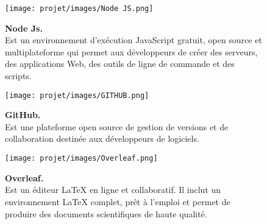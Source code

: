 \vspace{0.5cm}

\begin{figure}[H]
    \centering
    \begin{minipage}[c]{0.3\textwidth}
        \texttt{[image: projet/images/Node JS.png]}
    \end{minipage}
    \hspace{1cm}
    \begin{minipage}[c]{0.6\textwidth}
        \textbf{Node Js.}\\[0.5em]
        Est un environnement d'exécution JavaScript gratuit, open source et multiplateforme qui permet aux développeurs de créer des serveurs, des applications Web, des outils de ligne de commande et des scripts. \cite{ref6}
    \end{minipage}
\end{figure}

\vspace{0.5cm}

\begin{figure}[H]
    \centering
    \begin{minipage}[c]{0.3\textwidth}
        \texttt{[image: projet/images/GITHUB.png]}
    \end{minipage}
    \hspace{1cm}
    \begin{minipage}[c]{0.6\textwidth}
        \textbf{GitHub.}\\[0.5em]
        Est une plateforme open source de gestion de versions et de collaboration destinée aux développeurs de logiciels. \cite{ref7}
    \end{minipage}
\end{figure}

\vspace{0.5cm}

\begin{figure}[H]
    \centering
    \begin{minipage}[c]{0.3\textwidth}
        \texttt{[image: projet/images/Overleaf.png]}
    \end{minipage}
    \hspace{1cm}
    \begin{minipage}[c]{0.6\textwidth}
        \textbf{Overleaf.}\\[0.5em]
        Est un éditeur LaTeX en ligne et collaboratif. Il inclut un environnement LaTeX complet, prêt à l’emploi et permet de produire des documents scientifiques de haute qualité. \cite{ref8}
    \end{minipage}
\end{figure}
\vspace{0.5cm}

